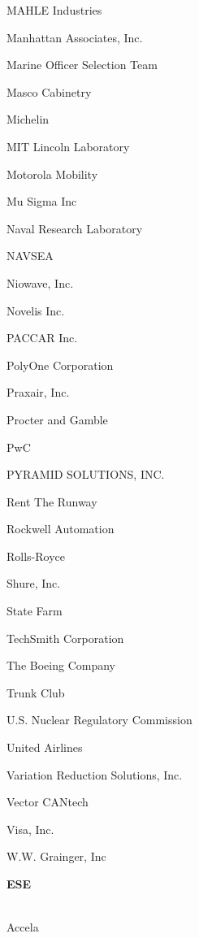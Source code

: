 \documentclass[twoside]{article}
\begin{document}
\begin{center}
\begin{multicols}{5}
\begin{FlushLeft}
\begin{compactitem}
\item MAHLE Industries
\item Manhattan Associates, Inc.
\item Marine Officer Selection Team
\item Masco Cabinetry
\item Michelin
\item MIT Lincoln Laboratory
\item Motorola Mobility
\item Mu Sigma Inc
\item Naval Research Laboratory
\item NAVSEA
\item Niowave, Inc.
\item Novelis Inc.
\item PACCAR Inc.
\item PolyOne Corporation
\item Praxair, Inc.
\item Procter and Gamble
\item PwC
\item PYRAMID SOLUTIONS, INC.
\item Rent The Runway
\item Rockwell Automation
\item Rolls-Royce
\item Shure, Inc.
\item State Farm
\item TechSmith Corporation
\item The Boeing Company
\item Trunk Club
\item U.S. Nuclear Regulatory Commission
\item United Airlines
\item Variation Reduction Solutions, Inc.
\item Vector CANtech
\item Visa, Inc.
\item W.W. Grainger, Inc
\end{compactitem}
        \end{FlushLeft}
        \vspace{1em}
        {\fontsize{14}{16}\selectfont \bf ESE}\\
        \vspace{-1em}
        ~\hrulefill~
        \vspace{-.9em}
        \begin{FlushLeft}
        \begin{compactitem}
        \item Accela

\end{compactitem}
\end{FlushLeft}
\end{multicols}
\end{center}
\end{document}

